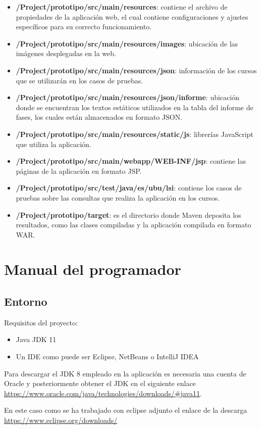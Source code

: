 \begin{itemize}
	\item \textbf{/Project/prototipo/src/main/resources}: contiene el archivo de propiedades de la aplicación web, el cual contiene configuraciones y ajustes específicos para su correcto funcionamiento.
	\item \textbf{/Project/prototipo/src/main/resources/images}: ubicación de las imágenes desplegadas en la web.
	\item \textbf{/Project/prototipo/src/main/resources/json}: información de los cursos que se utilizarán en los casos de pruebas.
	\item \textbf{/Project/prototipo/src/main/resources/json/informe}: ubicación donde se encuentran los textos estáticos utilizados en la tabla del informe de fases, los cuales están almacenados en formato JSON.
	\item \textbf{/Project/prototipo/src/main/resources/static/js}: librerías JavaScript que utiliza la aplicación.
	\item \textbf{/Project/prototipo/src/main/webapp/WEB-INF/jsp}: contiene las páginas de la aplicación en formato JSP.
	\item \textbf{/Project/prototipo/src/test/java/es/ubu/lsi}: contiene los casos de pruebas sobre las consultas que realiza la aplicación en los cursos.
	\item \textbf{/Project/prototipo/target}: es el directorio donde Maven deposita los resultados, como las clases compiladas y la aplicación compilada en formato WAR.
	
\end{itemize}
\section{Manual del programador}
\subsection{Entorno}
Requisitos del proyecto:
\begin{itemize}
	\item Java JDK 11
	\item Un IDE como puede ser Eclipse, NetBeans o IntelliJ IDEA
\end{itemize}

Para descargar el JDK 8 empleado en la aplicación es necesaria una cuenta de Oracle y posteriormente obtener el JDK en el siguiente enlace \url{https://www.oracle.com/java/technologies/downloads/#java11}.

En este caso como se ha trabajado con eclipse adjunto el enlace de la descarga \url{https://www.eclipse.org/downloads/}


